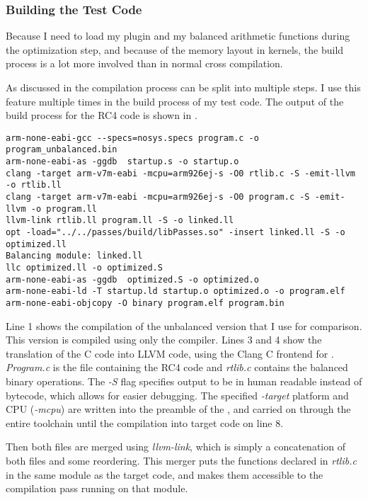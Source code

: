 \subsubsection{Building the Test Code}
\label{buildtest}
Because I need to load my plugin and my balanced arithmetic functions during the optimization step, and because of the memory layout in \qemu{} kernels, the build process is a lot more involved than in normal cross compilation.

As discussed in  the \llvm{} compilation process can be split into multiple steps.
I use this feature multiple times in the build process of my test code.
The output of the build process for the RC4 code is shown in .

\begin{lstlisting}[caption=Output of the Makefile, label=lst:makefile-output]
arm-none-eabi-gcc --specs=nosys.specs program.c -o program_unbalanced.bin
arm-none-eabi-as -ggdb  startup.s -o startup.o
clang -target arm-v7m-eabi -mcpu=arm926ej-s -O0 rtlib.c -S -emit-llvm -o rtlib.ll
clang -target arm-v7m-eabi -mcpu=arm926ej-s -O0 program.c -S -emit-llvm -o program.ll
llvm-link rtlib.ll program.ll -S -o linked.ll
opt -load="../../passes/build/libPasses.so" -insert linked.ll -S -o optimized.ll
Balancing module: linked.ll
llc optimized.ll -o optimized.S
arm-none-eabi-as -ggdb  optimized.S -o optimized.o
arm-none-eabi-ld -T startup.ld startup.o optimized.o -o program.elf
arm-none-eabi-objcopy -O binary program.elf program.bin
\end{lstlisting}

Line 1 shows the compilation of the unbalanced version that I use for comparison.
This version is compiled using only the \crossgcc{} compiler.
Lines 3 and 4 show the translation of the C code into LLVM code, using the Clang\cite{lattner2008llvm} C frontend for \llvm{}.
\emph{Program.c} is the file containing the RC4 code and \emph{rtlib.c} contains the balanced binary operations.
The \emph{-S} flag specifies output to be in human readable \ir{} instead of bytecode, which allows for easier debugging.
The specified \emph{-target} platform and CPU (\emph{-mcpu}) are written into the preamble of the \ir{}, and carried on through the entire toolchain until the compilation into target code on line 8.

Then both \llvm{} files are merged using \emph{llvm-link}, which is simply a concatenation of both files and some reordering.
This merger puts the functions declared in \emph{rtlib.c} in the same module as the target code, and makes them accessible to the compilation pass running on that module.

